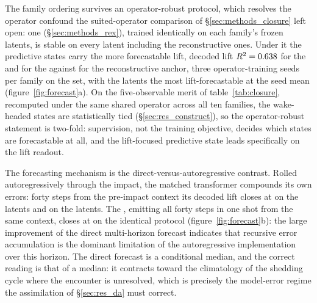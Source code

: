 
The family ordering survives an operator-robust protocol, which resolves
the operator confound the suited-operator comparison of
\S\ref{sec:methods_closure} left open: one \DirectFC{}
(\S\ref{sec:methods_rex}), trained identically on each family's frozen
latents, is stable on every latent including the reconstructive ones. Under
it the predictive states carry the more forecastable lift, decoded lift
$R^2 = 0.638{}$ for the \PredState{} and \RexFamCln{} for the \LiftState{} against
\RexFamAeLw{} for the reconstructive anchor, three operator-training seeds
per family on the \TestSplit{} set, with the \LiftState{} latents the most
lift-forecastable at the seed mean
(figure~\ref{fig:forecast}a). On the five-observable merit of
table~\ref{tab:closure}, recomputed under the same shared operator across
all ten families, the wake-headed states are statistically tied
(\S\ref{sec:res_construct}), so the operator-robust statement is two-fold:
supervision, not the training objective, decides which states are
forecastable at all, and the lift-focused predictive state leads
specifically on the lift readout.\re

The forecasting mechanism is the direct-versus-autoregressive contrast.
Rolled autoregressively through the impact, the matched transformer
compounds its own errors: forty steps from the pre-impact context its
decoded lift closes at \ArFortyClw{} on the \PredState{} latents and
\ArFortyCln{} on the \LiftState{} latents. The \DirectFC, emitting all forty steps in
one shot from the same context, closes at \RexTunedCl{} on the identical
protocol (figure~\ref{fig:forecast}b): the large improvement of the direct
multi-horizon forecast indicates that recursive error accumulation is the
dominant limitation of the autoregressive implementation over this horizon.
The direct forecast is a conditional median, and the
correct reading is that of a median: it contracts toward the climatology of
the shedding cycle where the encounter is unresolved, which is precisely
the model-error regime the assimilation of \S\ref{sec:res_da} must
correct.\re

